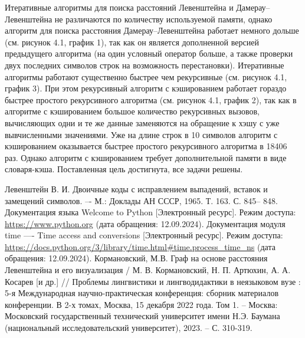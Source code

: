 \documentclass[a4paper,14pt, unknownkeysallowed]{extreport}
\begin{document}
Итеративные алгоритмы для поиска расстояний Левенштейна и Дамерау--Левенштейна не различаются по количеству используемой памяти, однако алгоритм для поиска расстояния Дамерау--Левенштейна работает немного дольше (см. рисунок 4.1, график 1), так как он является дополненной версией предыдущего алгоритма (на один условный оператор больше, а также проверки двух последних символов строк на возможность перестановки).
Итеративные алгоритмы работают существенно быстрее чем рекурсивные (см. рисунок 4.1, график 3). При этом рекурсивный алгоритм с кэшированием работает гораздо быстрее простого рекурсивного алгоритма (см. рисунок 4.1, график 2), так как в алгоритме с кэшированием большое количество рекурсивных вызовов, вычисляющих одни и те же данные заменяются на обращение к хэшу с уже вывчисленными значениями. Уже на длине строк в 10 символов алгоритм с кэшированием оказывается быстрее простого рекурсивного алгоритма в 18406 раз. Однако алгоритм с кэшированием требует дополнительной памяти в виде словаря-кэша.
Поставленная цель достигнута, все задачи решены.

\vspace{5mm}



\renewcommand{\bibname}{Список использованных источников}
\begin{thebibliography}{5}
	Левенштейн В. И. Двоичные коды с исправлением выпадений, вставок и замещений символов. –- М.: Доклады АН СССР, 1965. Т. 163. С. 845– 848.
	Документация языка Welcome to Python [Электронный ресурс]. Режим доступа: \url{https://www.python.org} (дата обращения: 12.09.2024).
	Документация модуля time —- Time access and conversions [Электронный ресурс]. Режим доступа: \url{https://docs.python.org/3/library/time.html#time.process_time_ns} (дата обращения: 12.09.2024).
	Кормановский, М.В. Граф на основе расстояния Левенштейна и его визуализация / М. В. Кормановский, Н. П. Артюхин, А. А. Косарев [и др.] // Проблемы лингвистики и лингводидактики в неязыковом вузе : 5-я Международная научно-практическая конференция: сборник материалов конференции. В 2-х томах, Москва, 15 декабря 2022 года. Том 1. – Москва: Московский государственный технический университет имени Н.Э. Баумана (национальный исследовательский университет), 2023. – С. 310-319.
\end{thebibliography}

\end{document}
